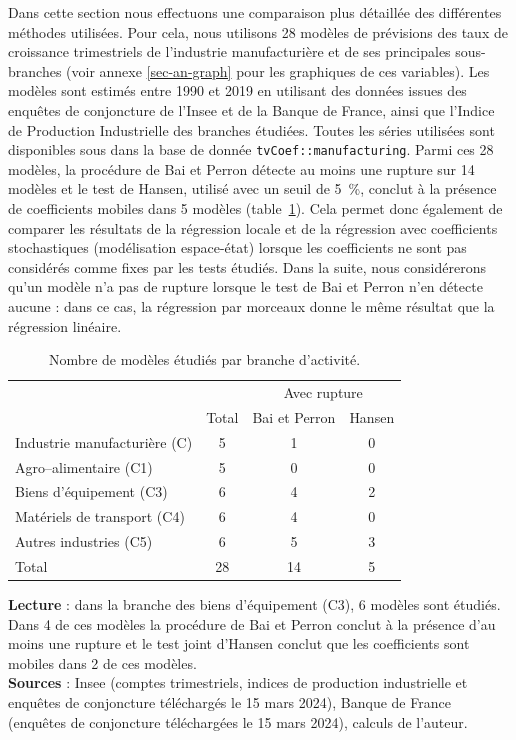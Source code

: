 \documentclass[
  a4paper,
  DIV=11,
  numbers=noendperiod,
  french]{scrartcl}
\newcommand\1{{\mathds 1}}
\theoremstyle{remark}
\begin{document}
Dans cette section nous effectuons une comparaison plus détaillée des
différentes méthodes utilisées. Pour cela, nous utilisons 28 modèles de
prévisions des taux de croissance trimestriels de l'industrie
manufacturière et de ses principales sous-branches (voir annexe
\ref{sec-an-graph} pour les graphiques de ces variables). Les modèles
sont estimés entre 1990 et 2019 en utilisant des données issues des
enquêtes de conjoncture de l'Insee et de la Banque de France, ainsi que
l'Indice de Production Industrielle des branches étudiées. Toutes les
séries utilisées sont disponibles sous  dans la base
de donnée \texttt{tvCoef::manufacturing}. Parmi ces 28 modèles, la
procédure de Bai et Perron détecte au moins une rupture sur 14 modèles
et le test de Hansen, utilisé avec un seuil de 5~\%, conclut à la
présence de coefficients mobiles dans 5 modèles
(table~\ref{tbl-nb-models}). Cela permet donc également de comparer les
résultats de la régression locale et de la régression avec coefficients
stochastiques (modélisation espace-état) lorsque les coefficients ne
sont pas considérés comme fixes par les tests étudiés. Dans la suite,
nous considérerons qu'un modèle n'a pas de rupture lorsque le test de
Bai et Perron n'en détecte aucune : dans ce cas, la régression par
morceaux donne le même résultat que la régression linéaire.

\begin{longtable}{l|ccc}

\caption{\label{tbl-nb-models}Nombre de modèles étudiés par branche
d'activité.}

\tabularnewline

\toprule
\multicolumn{1}{l}{} &  & \multicolumn{2}{c}{Avec rupture} \\ 
\cmidrule(lr){3-4}
\multicolumn{1}{l}{} & Total & Bai et Perron & Hansen \\ 
\midrule\addlinespace[2.5pt]
Industrie manufacturière (C) & 5 & 1 & 0 \\ 
Agro–alimentaire (C1) & 5 & 0 & 0 \\ 
Biens d'équipement (C3) & 6 & 4 & 2 \\ 
Matériels de transport (C4) & 6 & 4 & 0 \\ 
Autres industries (C5) & 6 & 5 & 3 \\ 
\midrule 
\midrule 
Total & 28 & 14 & 5 \\ 
\bottomrule

\end{longtable}

{\footnotesize\raggedright

\textbf{Lecture} : dans la branche des biens d'équipement (C3), 6
modèles sont étudiés. Dans 4 de ces modèles la procédure de Bai et
Perron conclut à la présence d'au moins une rupture et le test joint
d'Hansen conclut que les coefficients sont mobiles dans 2 de ces
modèles.\\
\textbf{Sources} : Insee (comptes trimestriels, indices de production
industrielle et enquêtes de conjoncture téléchargés le 15 mars 2024),
Banque de France (enquêtes de conjoncture téléchargées le 15 mars 2024),
calculs de l'auteur.

}
\end{document}
